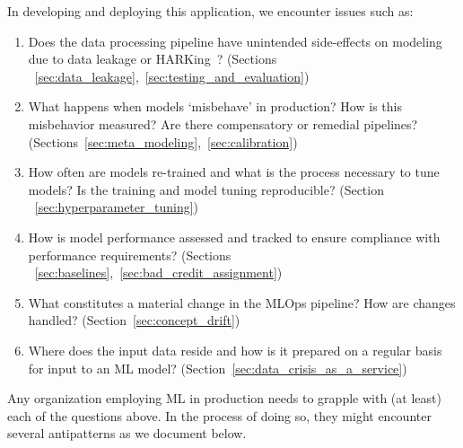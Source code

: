 In developing and deploying this application, we encounter issues such as:
\begin{enumerate}
    \item Does the data processing pipeline have unintended side-effects on modeling due to data leakage or HARKing~\cite{gencoglu2019hark}? (Sections ~\ref{sec:data_leakage},~\ref{sec:testing_and_evaluation})
   \item What happens when models `misbehave' in production? How is this misbehavior measured? Are there compensatory or remedial pipelines? (Sections~\ref{sec:meta_modeling},~\ref{sec:calibration})
    \item How often are models re-trained and what is the process necessary to tune models? Is the training and model tuning reproducible? (Section ~\ref{sec:hyperparameter_tuning})
    \item How is model performance assessed and tracked to ensure compliance with performance requirements? (Sections ~\ref{sec:baselines},~\ref{sec:bad_credit_assignment})
    \item What constitutes a material change in the MLOps pipeline? How are changes handled? (Section~\ref{sec:concept_drift})
    \item Where does the input data reside and how is it prepared on a regular basis for input to an ML model? (Section~\ref{sec:data_crisis_as_a_service})
\end{enumerate}
\iffalse 
\begin{enumerate}
    \item Where does the input data reside and how is it prepared on a regular basis for input to an ML model? (Section~\ref{sec:data_crisis_as_a_service})
    \item How often are models re-trained and what is the process necessary to tune models? Is the training and model tuning reproducible? (Section ~\ref{sec:hyperparameter_tuning})
    \item How is model performance assessed and tracked to ensure compliance with performance requirements? (Sections ~\ref{sec:baselines},~\ref{sec:bad_credit_assignment})
    \item Does the data processing pipeline have unintended side-effects on modeling due to data leakage or HARKing~\cite{gencoglu2019hark}? (Sections ~\ref{sec:data_leakage},~\ref{sec:testing_and_evaluation})
    \item Who certifies models for production and how often?
    \item What happens when models `misbehave' in production? How is this misbehavior measured? Are there compensatory or remedial pipelines? (Sections~\ref{sec:meta_modeling},~\ref{sec:calibration})
    \item What constitutes a material change in the MLOps pipeline? How are changes handled? (Section~\ref{sec:concept_drift})
\end{enumerate}
\fi 
\noindent
Any organization employing ML in production needs to grapple with (at least) each of the questions above. In the process of doing so, they might encounter several
antipatterns as we document below.